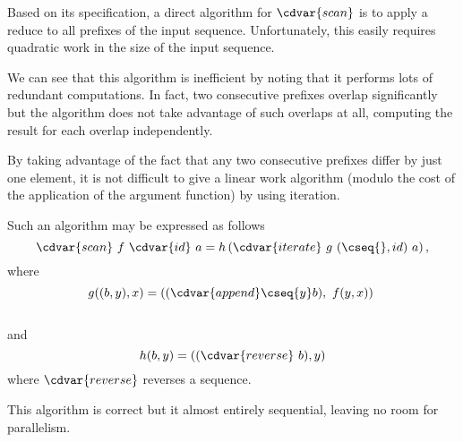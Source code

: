 \begin{cluster}
\label{grp:grm:design::contraction::based}

\begin{gram}
\label{grm:design::contraction::based}
Based on its specification, a direct algorithm for $\cdvar{scan}$ is to
apply a reduce to all prefixes of the input sequence.  
Unfortunately, this easily requires quadratic work in the size of the
input sequence.

We can see that this algorithm is inefficient by noting that it
performs lots of redundant computations.  In fact, two consecutive
prefixes overlap significantly but the algorithm does not take
advantage of such overlaps at all, computing the result for each
overlap independently. 

By taking advantage of the fact that any two consecutive prefixes
differ by just one element, it is not difficult to give a linear work
algorithm (modulo the cost of the application of the argument
function) by using iteration.  

Such an algorithm may be expressed as
follows
\[
\cdvar{scan}~f~\cdvar{id}~{a} = h \left( \cdvar{iterate}~g~(\cseq{},id)~a \right), 
\]
where
\[ 
g((b, y), x) = ((\cdvar{append} \cseq{y} b),~f(y,x))~
\]
\\
and 
\\
\[
h (b,y) = ((\cdvar{reverse}~b), y)
\]
where $\cdvar{reverse}$ reverses a sequence.

This algorithm is correct but it almost entirely sequential, leaving
no room for parallelism.

\end{gram}
\end{cluster}

